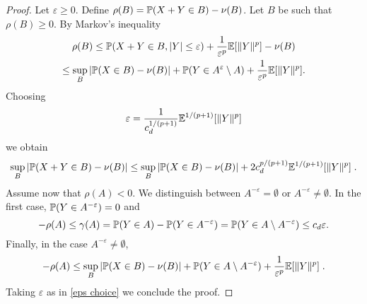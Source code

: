 \begin{proof}
Let $\varepsilon \geq 0$. Define
$\rho(B) = \mathbb{P}(X + Y \in B) - \nu(B)$. 
Let $B$ be such that $\rho(B) \geq 0$.  By Markov's inequality
\begin{multline}
\rho(B) \le \mathbb{P}(X + Y \in B, |Y| \le \varepsilon) + \frac{1}{\varepsilon^{p}} \mathbb{E} [\|Y\|^p] - \nu(B) \\
    \le \sup_{B}|\mathbb{P}(X \in B) - \nu(B)| + \mathbb{P}(Y \in A^\varepsilon \setminus A) + \frac{1}{\varepsilon^{p}} \mathbb{E} [\|Y\|^p].  
\end{multline}   
Choosing 
\begin{equation}
\label{eps choice}
    \varepsilon = \frac{1}{c_d^{1/(p+1)}}\mathbb{E}^{1/(p+1)}[\|Y\|^p]
\end{equation}
we obtain
\begin{equation}
\sup_{B}|\mathbb{P}(X + Y \in B) - \nu(B)| \le \sup_{B }|\mathbb{P}(X \in B) - \nu(B)| + 2 c_d^{p/(p+1)} \mathbb{E}^{1/(p+1)}[\|Y\|^p] \;. 
\end{equation}
Assume now that $\rho(A) < 0$. We distinguish between $A^{-\varepsilon} = \emptyset$ or $A^{-\varepsilon} \neq \emptyset$. In the first case, $\mathbb{P}(Y \in A^{-\varepsilon}) = 0$ and
$$
-\rho(A) \le \gamma(A) = \mathbb{P}(Y \in A) - \mathbb{P}(Y \in A^{-\varepsilon}) = \mathbb{P}(Y \in A \setminus A^{-\varepsilon}) \le c_d \varepsilon.  
$$
Finally, in the case $A^{-\varepsilon} \neq \emptyset$,
$$
-\rho(A) \le \sup_{B}|\mathbb{P}(X \in B) - \nu(B)| + \mathbb{P}(Y \in A \setminus A^{-\varepsilon}) + \frac{1}{\varepsilon^{p}} \mathbb{E} [\|Y\|^p]\;. 
$$
Taking $\varepsilon$ as in \eqref{eps choice}
we conclude the proof.
\end{proof}



